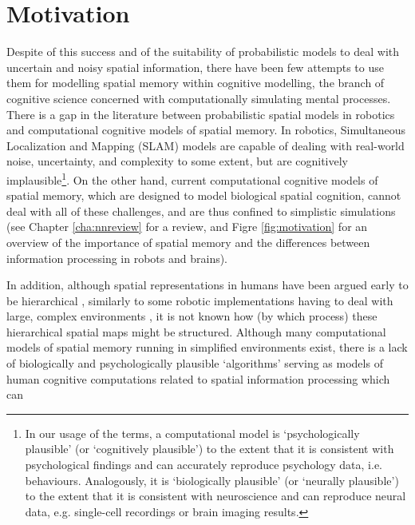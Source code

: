 \section{Motivation}
\label{sec:intro:motivation}

Despite of this success and of the suitability of probabilistic models to deal with uncertain and noisy spatial information, there have been few attempts to use them for modelling spatial memory within cognitive modelling, the branch of cognitive science concerned with computationally simulating mental processes. There is a gap in the literature between probabilistic spatial models in robotics and computational cognitive models of spatial memory. In robotics, Simultaneous Localization and Mapping (SLAM) models \citep{thrun2008simultaneous} are capable of dealing with real-world noise, uncertainty, and complexity to some extent, but are cognitively implausible\footnote{In our usage of the terms, a computational model is `psychologically plausible' (or `cognitively plausible') to the extent that it is consistent with psychological findings and can accurately reproduce psychology data, i.e. behaviours. Analogously, it is `biologically plausible' (or `neurally plausible') to the extent that it is consistent with neuroscience and can reproduce neural data, e.g. single-cell recordings or brain imaging results.}. On the other hand,  current computational cognitive models of spatial memory, which are designed to model biological spatial cognition,  cannot deal with all of these challenges, and are thus confined to simplistic simulations (see Chapter \ref{cha:nnreview} for a review, and Figre \ref{fig:motivation} for an overview of the importance of spatial memory and the differences between information processing in robots and brains). 


In addition, although spatial representations in humans have been argued early to be hierarchical \citep{hirtle1985evidence, mcnamara1989subjective, greenauer2010micro}, similarly to some robotic implementations having to deal with large, complex environments \citep{kuipers2000spatial, wurm2010octomap}, it is not known how (by which process) these hierarchical spatial maps might be structured. Although many computational models of spatial memory running in simplified environments exist, there is a lack of biologically and psychologically plausible `algorithms' serving as models of human cognitive computations related to spatial information processing which can 


